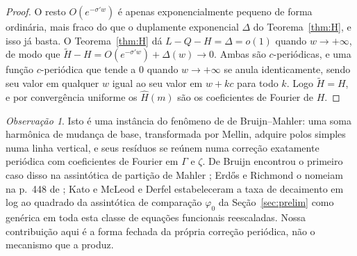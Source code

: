 \documentclass[11pt]{amsart}
\theoremstyle{plain}
\theoremstyle{definition}
\theoremstyle{remark}
\newtheorem{remark}[theorem]{Observação}
\begin{document}
\begin{proof}
O resto $O(e^{-\sigma'w})$ é apenas exponencialmente pequeno de forma ordinária, mais fraco do que
o duplamente exponencial $\Delta$ do Teorema~\ref{thm:H}, e isso já basta. O Teorema~\ref{thm:H} dá
$L-Q-H=\Delta=o(1)$ quando $w\to+\infty$, de modo que $\widetilde H-H = O(e^{-\sigma'w})+\Delta(w)\to0$.
Ambas são $c$-periódicas, e uma função $c$-periódica que tende a $0$ quando $w\to+\infty$ se anula
identicamente, sendo seu valor em qualquer $w$ igual ao seu valor em $w+kc$ para todo $k$. Logo
$\widetilde H=H$, e por convergência uniforme os $\hat H(m)$ são os coeficientes de Fourier de $H$.
\end{proof}

\begin{remark}
Isto é uma instância do fenômeno de de Bruijn--Mahler: uma soma harmônica de mudança de base,
transformada por Mellin, adquire polos simples numa linha vertical, e seus resíduos se reúnem numa
correção exatamente periódica com coeficientes de Fourier em $\Gamma$ e $\zeta$. De Bruijn encontrou
o primeiro caso disso na assintótica de partição de Mahler \cite{debruijn1948}; Erd\H{o}s e
Richmond o nomeiam na p.~448 de \cite{erdosrichmond1976}; Kato e McLeod \cite{katomcleod1971} e
Derfel \cite{derfel1995} estabeleceram a taxa de decaimento em log ao quadrado da assintótica de
comparação $\varphi_0$ da Seção~\ref{sec:prelim} como genérica em toda esta classe de equações
funcionais reescaladas. Nossa contribuição aqui é a forma fechada da própria correção periódica, não
o mecanismo que a produz.
\end{remark}
\end{document}
